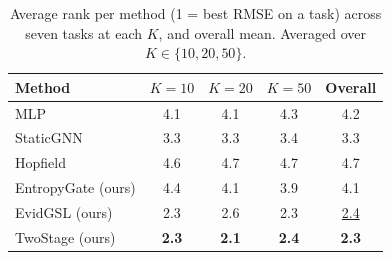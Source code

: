 \begin{table}[t]
\centering
\small
\caption{Average rank per method (1 = best RMSE on a task) across seven tasks at each $K$, and overall mean. Averaged over $K\!\in\!\{10,20,50\}$.}
\label{tab:wincount}
\begin{tabular}{lcccc}
\toprule
Method & $K{=}10$ & $K{=}20$ & $K{=}50$ & Overall \\
\midrule
MLP         & 4.1 & 4.1 & 4.3 & 4.2 \\
StaticGNN   & 3.3 & 3.3 & 3.4 & 3.3 \\
Hopfield  & 4.6 & 4.7 & 4.7 & 4.7 \\
\midrule
EntropyGate (ours) & 4.4 & 4.1 & 3.9 & 4.1 \\
EvidGSL (ours)    & 2.3 & 2.6 & 2.3 & \underline{2.4} \\
TwoStage (ours)    & \textbf{2.3} & \textbf{2.1} & \textbf{2.4} & \textbf{2.3} \\
\bottomrule
\end{tabular}
\end{table}
